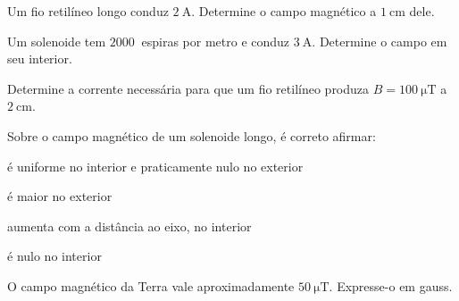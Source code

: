 \blocofixacao
\begin{questao}[1]{}

Um fio retilíneo longo conduz $\SI{2}{\ampere}$. Determine o campo magnético a
$\SI{1}{\centi\meter}$ dele.


\end{questao}
\begin{questao}[1]{}

Um solenoide tem $\SI{2000}{}$ espiras por metro e conduz
$\SI{3}{\ampere}$. Determine o campo em seu interior.


\end{questao}
\begin{questao}[1]{}

Determine a corrente necessária para que um fio retilíneo produza
$B=\SI{100}{\micro\tesla}$ a $\SI{2}{\centi\meter}$.


\end{questao}
\begin{questao}[1]{}

Sobre o campo magnético de um solenoide longo, é correto afirmar:
\begin{alternativas}[2]
\item é uniforme no interior e praticamente nulo no exterior
\item é maior no exterior
\item aumenta com a distância ao eixo, no interior
\item é nulo no interior
\end{alternativas}


\end{questao}
\begin{questao}[1]{}

O campo magnético da Terra vale aproximadamente $\SI{50}{\micro\tesla}$.
Expresse-o em gauss.


\end{questao}

